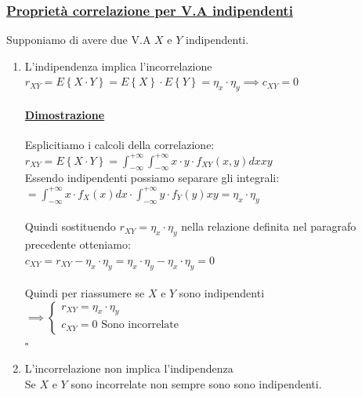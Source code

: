 \documentclass{article}
\begin{document}
\subsubsection{\underline{Proprietà correlazione per V.A indipendenti}}
Supponiamo di avere due V.A $X$ e $Y$ indipendenti.
\begin{enumerate}
    \item L'indipendenza implica l'incorrelazione \\
    $r_{XY} = E\left\{ X \cdot Y \right\} = E\left\{ X \right\} \cdot E\left\{ Y \right\} = \eta_x \cdot \eta_y \implies c_{XY} = 0$
    \paragraph{\underline{Dimostrazione}}
    Esplicitiamo i calcoli della correlazione: \\
    $r_{XY} = E\left\{ X \cdot Y \right\} = \int_{-\infty}^{+\infty} \int_{-\infty}^{+\infty} x \cdot y \cdot f_{XY}(x,y) dx xy$ \\
    Essendo indipendenti possiamo separare gli integrali: \\
    $= \int_{-\infty}^{+\infty} x \cdot f_X(x) dx \cdot \int_{-\infty}^{+\infty} y \cdot f_Y(y) xy = \eta_x \cdot \eta_y$ \\ \\
    Quindi sostituendo $r_{XY} = \eta_x \cdot \eta_y$ nella relazione definita nel paragrafo precedente otteniamo: \\
    $c_{XY} = r_{XY} - \eta_x \cdot \eta_y = \eta_x \cdot \eta_y - \eta_x \cdot \eta_y = 0$ \\ \\
    Quindi per riassumere se $X$ e $Y$ sono indipendenti $\implies \begin{cases}
        r_{XY} = \eta_x \cdot \eta_y \\
        c_{XY} = 0 \text{ Sono incorrelate}
    \end{cases}$ \\
    \hspace*{0pt}\hfill $\square$
    \item L'incorrelazione non implica l'indipendenza \\
    Se $X$ e $Y$ sono incorrelate non sempre sono sono indipendenti.

\end{enumerate}
\end{document}
